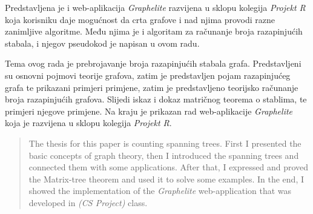 \documentclass[times, utf8, zavrsni]{fer}
\begin{document}
Predstavljena je i web-aplikacija \textit{Graphelite} razvijena u sklopu kolegija \textit{Projekt R} koja korisniku daje mogućnost da crta grafove i nad njima provodi razne zanimljive algoritme. Među njima je i algoritam za računanje broja razapinjućih stabala, i njegov pseudokod je napisan u ovom radu.




\begin{sazetak}
Tema ovog rada je prebrojavanje broja razapinjućih stabala grafa. Predstavljeni su osnovni pojmovi teorije grafova, zatim je predstavljen pojam razapinjućeg grafa te prikazani primjeri primjene, zatim je predstavljeno teorijsko računanje broja razapinjućih grafova. Slijedi iskaz i dokaz matričnog teorema o stablima, te primjeri njegove primjene. Na kraju je prikazan rad web-aplikacije \textit{Graphelite} koja je razvijena u sklopu kolegija \textit{Projekt R}.

\end{sazetak}

\begin{abstract}
The thesis for this paper is counting spanning trees. First I presented the basic concepts of graph theory, then I introduced the spanning trees and connected them with some applications. After that, I expressed and proved the Matrix-tree theorem and used it to solve some examples. In the end, I showed the implementation of the \textit{Graphelite} web-application that was developed in \textit{(CS Project)} class.

\end{abstract}
\end{document}
